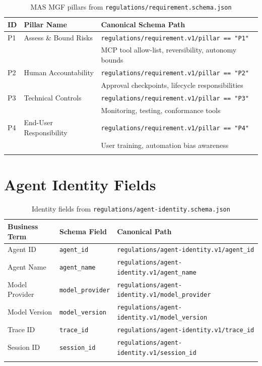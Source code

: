 \documentclass[11pt,a4paper]{report}
\newcommand{\schemapath}[1]{\texttt{\textcolor{pathcolor}{#1}}}
\newcommand{\fieldref}[1]{\texttt{\textcolor{sapblue}{#1}}}
\begin{document}
\begin{longtable}{@{}p{1cm}p{3.5cm}p{7.5cm}@{}}
\toprule
\textbf{ID} & \textbf{Pillar Name} & \textbf{Canonical Schema Path} \\
\midrule
\endhead
P1 & Assess \& Bound Risks & \schemapath{regulations/requirement.v1/pillar == "P1"} \\
 & & \footnotesize MCP tool allow-list, reversibility, autonomy bounds \\[3pt]
P2 & Human Accountability & \schemapath{regulations/requirement.v1/pillar == "P2"} \\
 & & \footnotesize Approval checkpoints, lifecycle responsibilities \\[3pt]
P3 & Technical Controls & \schemapath{regulations/requirement.v1/pillar == "P3"} \\
 & & \footnotesize Monitoring, testing, conformance tools \\[3pt]
P4 & End-User Responsibility & \schemapath{regulations/requirement.v1/pillar == "P4"} \\
 & & \footnotesize User training, automation bias awareness \\
\bottomrule
\caption{MAS MGF pillars from \schemapath{regulations/requirement.schema.json}}
\end{longtable}

\section{Agent Identity Fields}

\begin{longtable}{@{}p{3cm}p{4cm}p{5cm}@{}}
\toprule
\textbf{Business Term} & \textbf{Schema Field} & \textbf{Canonical Path} \\
\midrule
\endhead
Agent ID & \fieldref{agent\_id} & \schemapath{regulations/agent-identity.v1/agent\_id} \\
Agent Name & \fieldref{agent\_name} & \schemapath{regulations/agent-identity.v1/agent\_name} \\
Model Provider & \fieldref{model\_provider} & \schemapath{regulations/agent-identity.v1/model\_provider} \\
Model Version & \fieldref{model\_version} & \schemapath{regulations/agent-identity.v1/model\_version} \\
Trace ID & \fieldref{trace\_id} & \schemapath{regulations/agent-identity.v1/trace\_id} \\
Session ID & \fieldref{session\_id} & \schemapath{regulations/agent-identity.v1/session\_id} \\
\bottomrule
\caption{Identity fields from \schemapath{regulations/agent-identity.schema.json}}
\end{longtable}
\end{document}
